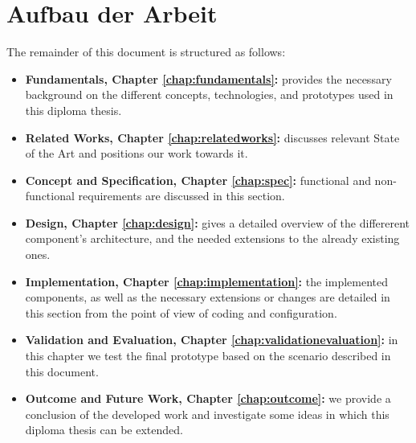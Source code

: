 \section{Aufbau der Arbeit}
\label{sec:Aufbau der Arbeit}

The remainder of this document is structured as follows:

\begin{itemize}
\item \textbf{Fundamentals, Chapter \ref{chap:fundamentals}:} provides the necessary background on the different concepts, technologies, and prototypes used in this diploma thesis.
\item \textbf{Related Works, Chapter \ref{chap:relatedworks}:} discusses relevant State of the Art and positions our work towards it.  
\item \textbf{Concept and Specification, Chapter \ref{chap:spec}:} functional and non-functional requirements are discussed in this section.
\item \textbf{Design, Chapter \ref{chap:design}:} gives a detailed overview of the differerent component's architecture, and the needed extensions to the already existing ones.
\item \textbf{Implementation, Chapter \ref{chap:implementation}:} the implemented components, as well as the necessary extensions or changes are detailed in this section from the point of view of coding and configuration. 
\item \textbf{Validation and Evaluation, Chapter \ref{chap:validationevaluation}:} in this chapter we test the final prototype based on the scenario described in this document. 
\item \textbf{Outcome and Future Work, Chapter \ref{chap:outcome}:} we provide a conclusion of the developed work and investigate some ideas in which this diploma thesis can be extended.
\end{itemize}